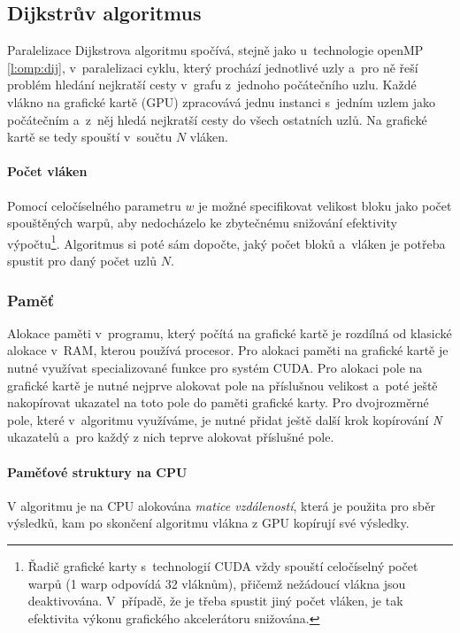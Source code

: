 \subsection{Dijkstrův algoritmus}
Paralelizace Dijkstrova algoritmu spočívá, stejně jako u~technologie openMP \ref{l:omp:dij}, v~paralelizaci cyklu, který prochází jednotlivé uzly a~pro ně řeší problém hledání nejkratší cesty v~grafu z~jednoho počátečního uzlu. Každé vlákno na grafické kartě (GPU) \cite{w:gpu} zpracovává jednu instanci s~jedním uzlem jako počátečním a~z~něj hledá nejkratší cesty do všech ostatních uzlů. Na grafické kartě se tedy spouští v~součtu $N$ vláken.

\paragraph{Počet vláken} \label{l:cuda:dijkstra:vlakna}
Pomocí celočíselného parametru $w$ je možné specifikovat velikost bloku jako počet spouštěných warpů, aby nedocházelo ke zbytečnému snižování efektivity výpočtu\footnote{Řadič grafické karty s~technologií CUDA vždy spouští celočíselný počet warpů (1 warp odpovídá 32 vláknům), přičemž nežádoucí vlákna jsou deaktivována. V~případě, že je třeba spustit jiný počet vláken, je tak efektivita výkonu grafického akcelerátoru snižována.}. Algoritmus si poté sám dopočte, jaký počet bloků a~vláken je potřeba spustit pro daný počet uzlů $N$. 

\subsubsection{Paměť}
Alokace paměti v~programu, který počítá na grafické kartě je rozdílná od klasické alokace v~RAM, kterou používá procesor. Pro alokaci paměti na grafické kartě je nutné využívat specializované funkce pro systém CUDA. Pro alokaci pole na grafické kartě je nutné nejprve alokovat pole na příslušnou velikost a~poté ještě nakopírovat ukazatel na toto pole do paměti grafické karty. Pro dvojrozměrné pole, které v~algoritmu využíváme, je nutné přidat ještě další krok kopírování \textit{N} ukazatelů a~pro každý z nich teprve alokovat příslušné pole.

\paragraph{Paměťové struktury na CPU}
V algoritmu je na CPU alokována \textit{matice vzdáleností}, která je použita pro sběr výsledků, kam po skončení algoritmu vlákna z GPU kopírují své výsledky.

